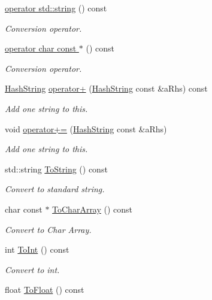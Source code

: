 \begin{DoxyCompactItemize}
\hyperlink{classHashString_af6f76264223d81badcecaf15beb85d80}{operator std\+::string} () const 
\begin{DoxyCompactList}\small\item\em Conversion operator. \end{DoxyCompactList}\item 
\hyperlink{classHashString_a85812a7906e76833cf8a2abeb0bc9e0e}{operator char const $\ast$} () const 
\begin{DoxyCompactList}\small\item\em Conversion operator. \end{DoxyCompactList}\item 
\hyperlink{classHashString}{Hash\+String} \hyperlink{classHashString_a67c6eab24e768aeb730fe5e13b2016af}{operator+} (\hyperlink{classHashString}{Hash\+String} const \&a\+Rhs) const 
\begin{DoxyCompactList}\small\item\em Add one string to this. \end{DoxyCompactList}\item 
void \hyperlink{classHashString_a78ca1b74c6e7ea0156504578d245f616}{operator+=} (\hyperlink{classHashString}{Hash\+String} const \&a\+Rhs)
\begin{DoxyCompactList}\small\item\em Add one string to this. \end{DoxyCompactList}\item 
std\+::string \hyperlink{classHashString_ad624a2a3163ead1be937e4b39139354b}{To\+String} () const 
\begin{DoxyCompactList}\small\item\em Convert to standard string. \end{DoxyCompactList}\item 
char const $\ast$ \hyperlink{classHashString_abfde6c536cd2e1a55c86ea29125f9f9a}{To\+Char\+Array} () const 
\begin{DoxyCompactList}\small\item\em Convert to Char Array. \end{DoxyCompactList}\item 
int \hyperlink{classHashString_a42007010c73206a9315cfba5859a6d56}{To\+Int} () const 
\begin{DoxyCompactList}\small\item\em Convert to int. \end{DoxyCompactList}\item 
float \hyperlink{classHashString_a7a9dc6ad220446625408ced0abfb9184}{To\+Float} () const 

\end{DoxyCompactItemize}
